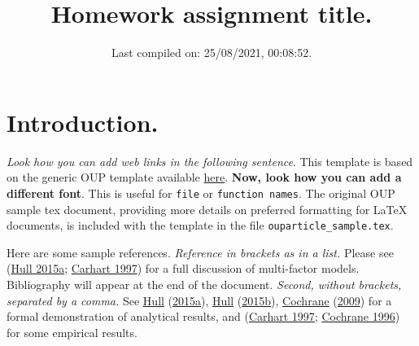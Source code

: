 \documentclass[12pt,halfline,a4paper,]{ouparticle}
\begin{document}
\title{\textbf{Homework assignment title.}}

\author{%
\address{778899}
\and
{}\address{774455}
\and
{}\address{884422}
\and
{}
}


\date{Last compiled on: 25/08/2021, 00:08:52.}


\maketitle



\hypersetup{linkcolor=blue}

\hypertarget{introduction.}{%
\section{Introduction.}\label{introduction.}}

\emph{Look how you can add web links in the following sentence}. This
template is based on the generic OUP template available
\href{https://academic.oup.com/icesjms/pages/General_Instructions}{here}.
\textbf{Now, look how you can add a different font}. This is useful for
\texttt{file} or \texttt{function names}. The original OUP sample tex
document, providing more details on preferred formatting for LaTeX
documents, is included with the template in the file
\texttt{ouparticle\_sample.tex}.

Here are some sample references. \emph{Reference in brackets as in a
list.} Please see (\protect\hyperlink{ref-Hull}{Hull 2015a};
\protect\hyperlink{ref-carhart1997persistence}{Carhart 1997}) for a full
discussion of multi-factor models. Bibliography will appear at the end
of the document. \emph{Second, without brackets, separated by a comma.}
See \protect\hyperlink{ref-Hull}{Hull}
(\protect\hyperlink{ref-Hull}{2015a}),
\protect\hyperlink{ref-Hull2}{Hull}
(\protect\hyperlink{ref-Hull2}{2015b}),
\protect\hyperlink{ref-cochrane2009asset}{Cochrane}
(\protect\hyperlink{ref-cochrane2009asset}{2009}) for a formal
demonstration of analytical results, and
(\protect\hyperlink{ref-carhart1997persistence}{Carhart 1997};
\protect\hyperlink{ref-cochrane1996cross}{Cochrane 1996}) for some
empirical results.
\end{document}
